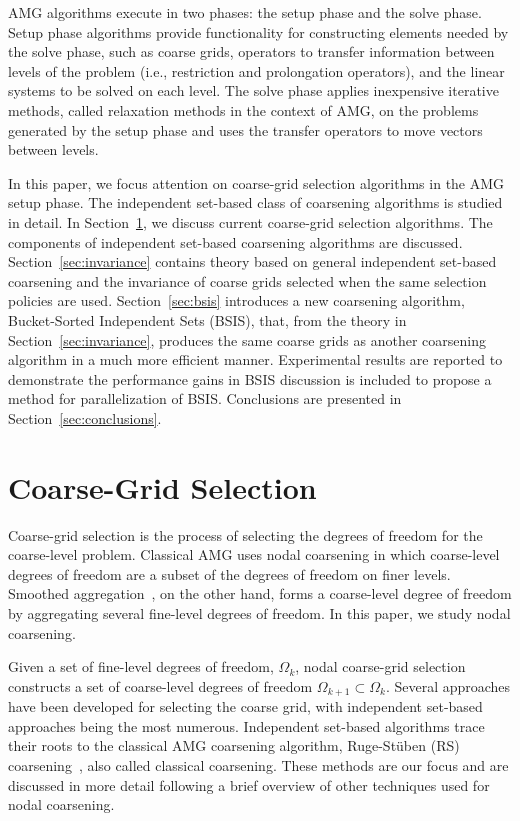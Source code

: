 \documentclass{elsart}
\begin{document}
AMG algorithms execute in two phases: the setup phase and the solve
phase. Setup phase algorithms provide functionality for constructing
elements needed by the solve phase, such as coarse grids, operators to
transfer information between levels of the problem (i.e., restriction
and prolongation operators), and the linear systems to be solved on
each level. The solve phase applies inexpensive iterative methods,
called relaxation methods in the context of AMG, on the problems
generated by the setup phase and uses the transfer operators to move
vectors between levels.

In this paper, we focus attention on coarse-grid selection algorithms
in the AMG setup phase. The independent set-based class of coarsening
algorithms is studied in detail. In Section~\ref{sec:cgs}, we discuss
current coarse-grid selection algorithms. The components of
independent set-based coarsening algorithms are
discussed. Section~\ref{sec:invariance} contains theory based on
general independent set-based coarsening and the invariance of coarse
grids selected when the same selection policies are
used. Section~\ref{sec:bsis} introduces a new coarsening algorithm,
Bucket-Sorted Independent Sets (BSIS), that, from the theory in
Section~\ref{sec:invariance}, produces the same coarse grids as
another coarsening algorithm in a much more efficient
manner. Experimental results are reported to demonstrate the
performance gains in BSIS discussion is included to propose a method
for parallelization of BSIS. Conclusions are presented in
Section~\ref{sec:conclusions}.

\section{Coarse-Grid Selection}
\label{sec:cgs}
Coarse-grid selection is the process of selecting the degrees of
freedom for the coarse-level problem. Classical AMG uses nodal
coarsening in which coarse-level degrees of freedom are a subset of
the degrees of freedom on finer levels. Smoothed
aggregation~\cite{Vanek1996,Vanek2001,brezina2005}, on the other hand,
forms a coarse-level degree of freedom by aggregating several
fine-level degrees of freedom. In this paper, we study nodal
coarsening.

Given a set of fine-level degrees of freedom, $\Omega_k$, nodal
coarse-grid selection constructs a set of coarse-level degrees of
freedom $\Omega_{k+1} \subset \Omega_k$. Several approaches have been
developed for selecting the coarse grid, with independent set-based
approaches being the most numerous. Independent set-based algorithms
trace their roots to the classical AMG coarsening algorithm,
Ruge-St\"uben (RS) coarsening~\cite{Ruge1987}, also called classical
coarsening. These methods are our focus and are discussed in more
detail following a brief overview of other techniques used for nodal
coarsening.
\end{document}

